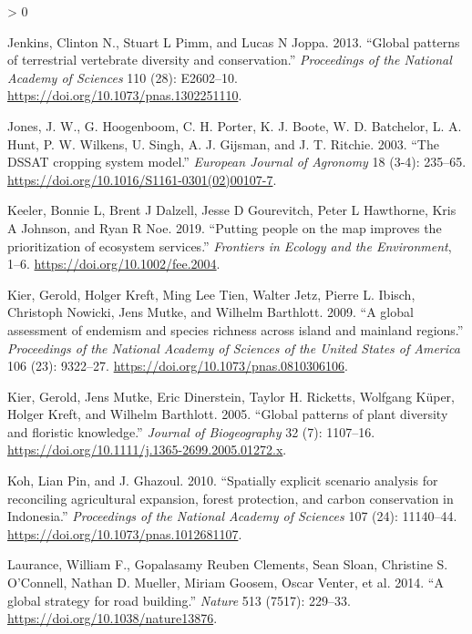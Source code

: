 \documentclass[
]{article}
\newlength{\cslhangindent}
\newenvironment{CSLReferences}[2] %
 {%
  \setlength{\parindent}{0pt}
  \ifodd #1 \everypar{\setlength{\hangindent}{\cslhangindent}}\ignorespaces\fi
  \ifnum #2 > 0
  \setlength{\parskip}{#2\baselineskip}
  \fi
 }%
 {}
\begin{document}
\begin{CSLReferences}{1}{0}
\leavevmode\hypertarget{ref-Jenkins2013}{}%
Jenkins, Clinton N., Stuart L Pimm, and Lucas N Joppa. 2013. {``{Global patterns of terrestrial vertebrate diversity and conservation}.''} \emph{Proceedings of the National Academy of Sciences} 110 (28): E2602--10. \url{https://doi.org/10.1073/pnas.1302251110}.

\leavevmode\hypertarget{ref-Jones2003}{}%
Jones, J. W., G. Hoogenboom, C. H. Porter, K. J. Boote, W. D. Batchelor, L. A. Hunt, P. W. Wilkens, U. Singh, A. J. Gijsman, and J. T. Ritchie. 2003. {``{The DSSAT cropping system model}.''} \emph{European Journal of Agronomy} 18 (3-4): 235--65. \url{https://doi.org/10.1016/S1161-0301(02)00107-7}.

\leavevmode\hypertarget{ref-Keeler2019}{}%
Keeler, Bonnie L, Brent J Dalzell, Jesse D Gourevitch, Peter L Hawthorne, Kris A Johnson, and Ryan R Noe. 2019. {``{Putting people on the map improves the prioritization of ecosystem services}.''} \emph{Frontiers in Ecology and the Environment}, 1--6. \url{https://doi.org/10.1002/fee.2004}.

\leavevmode\hypertarget{ref-Kier2009}{}%
Kier, Gerold, Holger Kreft, Ming Lee Tien, Walter Jetz, Pierre L. Ibisch, Christoph Nowicki, Jens Mutke, and Wilhelm Barthlott. 2009. {``{A global assessment of endemism and species richness across island and mainland regions}.''} \emph{Proceedings of the National Academy of Sciences of the United States of America} 106 (23): 9322--27. \url{https://doi.org/10.1073/pnas.0810306106}.

\leavevmode\hypertarget{ref-Kier2005}{}%
Kier, Gerold, Jens Mutke, Eric Dinerstein, Taylor H. Ricketts, Wolfgang Küper, Holger Kreft, and Wilhelm Barthlott. 2005. {``{Global patterns of plant diversity and floristic knowledge}.''} \emph{Journal of Biogeography} 32 (7): 1107--16. \url{https://doi.org/10.1111/j.1365-2699.2005.01272.x}.

\leavevmode\hypertarget{ref-Koh2010a}{}%
Koh, Lian Pin, and J. Ghazoul. 2010. {``{Spatially explicit scenario analysis for reconciling agricultural expansion, forest protection, and carbon conservation in Indonesia}.''} \emph{Proceedings of the National Academy of Sciences} 107 (24): 11140--44. \url{https://doi.org/10.1073/pnas.1012681107}.

\leavevmode\hypertarget{ref-Laurance2014a}{}%
Laurance, William F., Gopalasamy Reuben Clements, Sean Sloan, Christine S. O'Connell, Nathan D. Mueller, Miriam Goosem, Oscar Venter, et al. 2014. {``{A global strategy for road building}.''} \emph{Nature} 513 (7517): 229--33. \url{https://doi.org/10.1038/nature13876}.


\end{CSLReferences}
\end{document}
